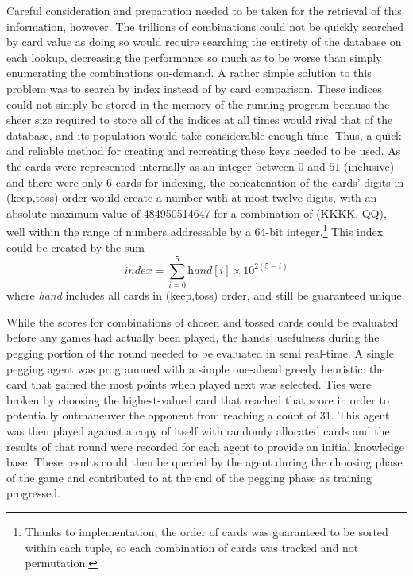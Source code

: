 Careful consideration and preparation needed to be taken
for the retrieval of this information, however.
%
The trillions of combinations could not be quickly searched by card value as
doing so would require searching the entirety of the database on each lookup,
decreasing the performance so much as to be worse than simply
enumerating the combinations on-demand.
%
A rather simple solution to this problem was to search by index
instead of by card comparison.
%
These indices could not simply be stored in the memory of the running program
because the sheer size required to store all of the indices at all times
would rival that of the database,
and its population would take considerable enough time.
%
Thus, a quick and reliable method for creating and recreating these keys
needed to be used.
%
As the cards were represented internally as an integer between $0$ and $51$
(inclusive)
and there were only 6 cards for indexing,
the concatenation of the cards' digits in (keep,toss) order
would create a number with at most twelve digits,
with an absolute maximum value of 484950514647
for a combination of
(K\spades K\clubs K\hearts K\diamonds, Q\hearts Q\diamonds),
well within the range of numbers addressable by a 64-bit integer.\footnote{
	Thanks to implementation,
	the order of cards was guaranteed to be sorted within each tuple,
	so each combination of cards was tracked and not permutation.
}
%
This index could be created by the sum
\[
	\textit{index} = \sum_{i=0}^{5} { \textit{hand}[i] \times 10^{2(5-i)} }
\]
where \textit{hand} includes all cards in (keep,toss) order,
and still be guaranteed unique.

While the scores for combinations of chosen and tossed cards could be evaluated 
before any games had actually been played,
the hands' usefulness during the pegging portion of the round needed to be
evaluated in semi real-time.
%
A single pegging agent was programmed with a simple one-ahead greedy heuristic:
the card that gained the most points when played next was selected.
%
Ties were
broken by choosing the highest-valued card that reached that score
in order to potentially outmaneuver the opponent from reaching a count of 31.
%
This agent was then played against a copy of itself with randomly allocated
cards and the results of that round were recorded for each agent to provide an
initial knowledge base.
%
These results could then be queried by the agent during the choosing phase of the
game and contributed to at the end of the pegging phase as training progressed.

